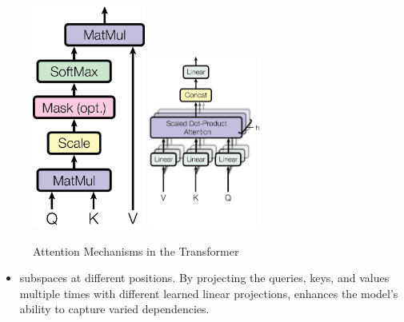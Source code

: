 \documentclass[final,t]{beamer}
\begin{document}
\begin{frame}[fragile]{}
\begin{columns}[t]
    \begin{column}{.3\linewidth}
	\begin{ntblock}
	\begin{figure}
		\centering
		\includegraphics[width=0.33\textwidth]{figures/ModalNet-19.png}
		\includegraphics[width=0.33\textwidth]{figures/ModalNet-20.png}
		\caption{Attention Mechanisms in the Transformer}
	\end{figure}
	\begin{itemize}
		\item[]  subspaces at different positions. By projecting the queries, keys, and values multiple times with different learned linear projections, enhances the model's ability to capture varied dependencies. 
	\end{itemize}
	\end{ntblock}


\end{column}
\end{columns}
\end{frame}
\end{document}
